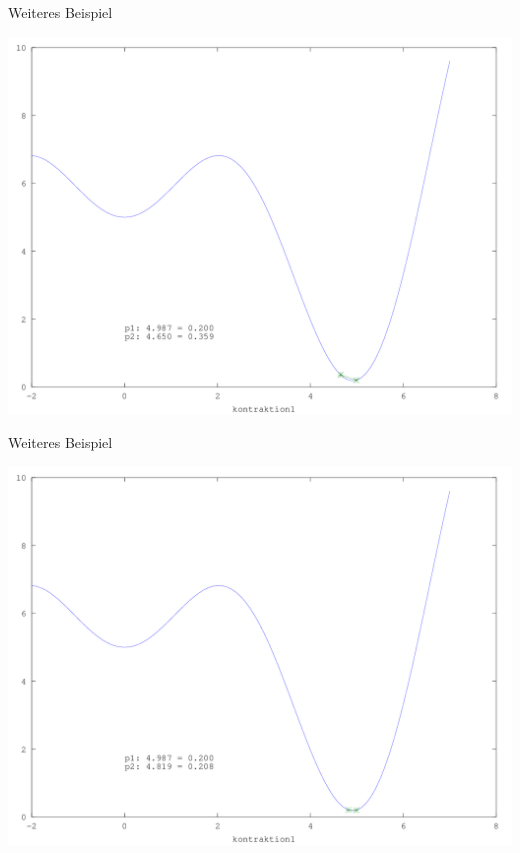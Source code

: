 \documentclass[\outputformat]{beamer}
\begin{document}
\begin{frame}{Weiteres Beispiel}
	\begin{center}
		\includegraphics[height=0.75\paperheight]{../bilder/GlobMinima/sinx_x007.png}
	\end{center}
\end{frame}
\begin{frame}{Weiteres Beispiel}
	\begin{center}
		\includegraphics[height=0.75\paperheight]{../bilder/GlobMinima/sinx_x008.png}
	\end{center}
\end{frame}
\end{document}
